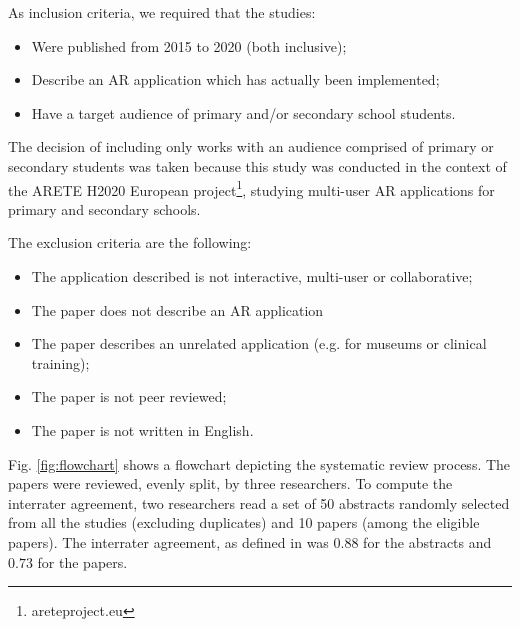 As inclusion criteria, we required that the studies:
\begin{itemize}
    \item Were published from 2015 to 2020 (both inclusive);
    \item Describe an AR application  which has actually been implemented;
    \item Have a target audience of primary and/or secondary school students.
\end{itemize}

The decision of including only works with an audience comprised of primary or secondary students was taken because this study was conducted in the context of the ARETE H2020 European project\footnote{areteproject.eu}, studying multi-user AR applications for primary and secondary schools.

The exclusion criteria are the following:

\begin{itemize}
    \item The application described is not interactive, multi-user or collaborative;
    \item The paper does not describe an AR application
    \item The paper describes an unrelated application (e.g. for museums or clinical training);
    \item The paper is not peer reviewed;
    \item The paper is not written in English.
\end{itemize}

Fig. \ref{fig:flowchart} shows a flowchart depicting the systematic review process. The \papersToRead papers were reviewed, evenly split, by three researchers. To compute the interrater agreement, two researchers read a set of 50 abstracts randomly selected from all the studies (excluding duplicates) and 10 papers (among the \papersToRead eligible papers). The interrater agreement, as defined in \cite{cohen1960coefficient} was $0.88$ for the abstracts and $0.73$ for the papers.

